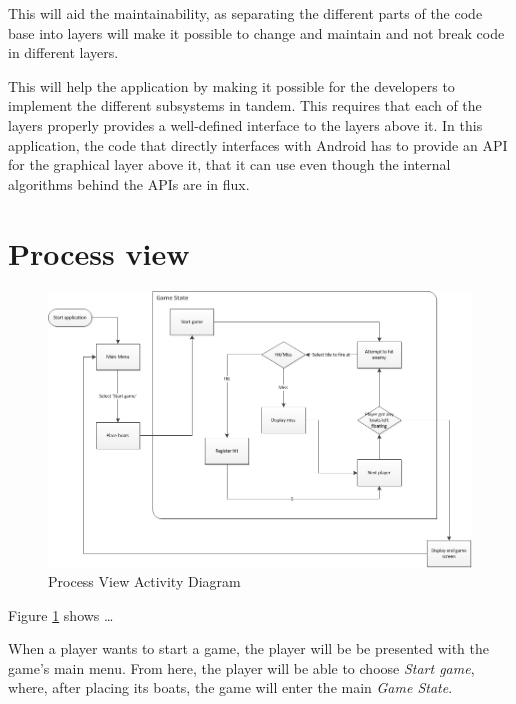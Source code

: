 This will aid the maintainability, as separating the different parts of the code base into layers will make it possible to change and maintain and not break code in different layers.


This will help the application by making it possible for the developers to implement the different subsystems in tandem. This requires that each of the layers properly provides a well-defined interface to the layers above it. In this application, the code that directly interfaces with Android has to provide an API for the graphical layer above it, that it can use even though the internal algorithms behind the APIs are in flux.


\section{Process view}
    
\begin{figure}[ht]
    \includegraphics[angle=90, scale=0.8]{ProcessLayer.png}
    \caption{Process View Activity Diagram}
    \label{fig:ActivityDiagram}
\end{figure}

Figure \ref{fig:ActivityDiagram} shows …

When a player wants to start a game, the player will be be presented with the game's main menu. From here, the player will be able to choose \emph{Start game}, where, after placing its boats, the game will enter the main \emph{Game State}.


